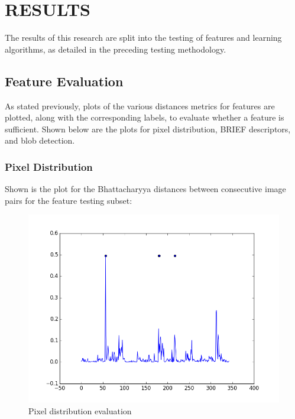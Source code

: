 %
%
%



\chapter{RESULTS}

The results of this research are split into the testing of features and learning algorithms, as detailed in the preceding testing methodology.

\section{Feature Evaluation}
As stated previously, plots of the various distances metrics for features are plotted, along with the corresponding labels, to evaluate whether a feature is sufficient.
Shown below are the plots for pixel distribution, BRIEF descriptors, and blob detection.

\subsection{Pixel Distribution}
Shown is the plot for the Bhattacharyya distances between consecutive image pairs for the feature testing subset:

\begin{figure}[h]
\centering
\includegraphics[scale=.50]{figures/611bhattest}
\caption{Pixel distribution evaluation}
\label{fig:tamu-fig3}
\end{figure}

